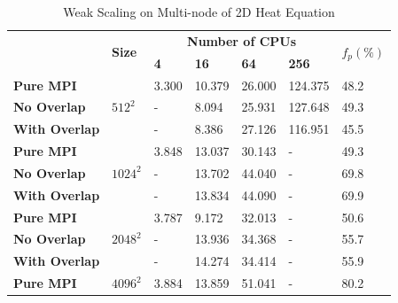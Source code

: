 \begin{table}[htbp]
  \caption{Weak Scaling on Multi-node of 2D Heat Equation}
  \label{TAB:Benchmark:Weak_PURE_MPI_Multi_Node}
  \begin{minipage}{\columnwidth}
    \begin{center}
      \footnotesize %
      \begin{tabular}{>{\bfseries}p{3cm} p{1.5cm} p{1.5cm} p{1.5cm} p{1.5cm} p{1.5cm} p{1cm}}
        \toprule
        \multirow{2}{*}{Strategy}     & \multirow{2}{*}{\bfseries Size} & \multicolumn{4}{c}{\bfseries  Number of CPUs}   & \multirow{2}{*}{\bfseries $f_p(\%)$}  \\
                                      &                                 & \bfseries 4   & \bfseries 16   & \bfseries 64  & \bfseries 256  &                        \\
        \midrule
        Pure MPI      & \multirow{3}{*}{$512^2$}      & 3.300  & 10.379  & 26.000   & 124.375                                    & 48.2 \\
        No Overlap    &                               &   -    &  8.094  & 25.931   & 127.648                                    & 49.3 \\
        With Overlap  &                               &   -    &  8.386  & 27.126   & 116.951                                    & 45.5 \\
        \midrule
        Pure MPI      & \multirow{3}{*}{$1024^2$}     & 3.848  & 13.037  & 30.143   &   -                                        & 49.3 \\
        No Overlap    &                               &   -    & 13.702  & 44.040   &   -                                        & 69.8 \\
        With Overlap  &                               &   -    & 13.834  & 44.090   &   -                                        & 69.9 \\
        \midrule
        Pure MPI      & \multirow{3}{*}{$2048^2$}     & 3.787  & 9.172   & 32.013   &   -                                        & 50.6 \\
        No Overlap    &                               &   -    & 13.936  & 34.368   &   -                                        & 55.7 \\
        With Overlap  &                               &   -    & 14.274  & 34.414   &   -                                        & 55.9 \\
        \midrule
        Pure MPI      & \multirow{3}{*}{$4096^2$}     & 3.884  & 13.859  & 51.041   &   -                                        & 80.2 \\

\end{tabular}
\end{center}
\end{minipage}
\end{table}
